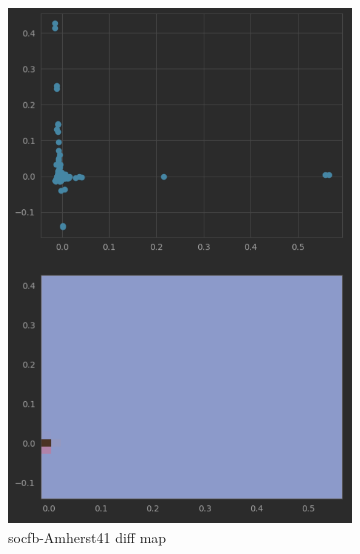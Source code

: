   \begin{figure}
  
    \begin{subfigure}{0.45\textwidth}
      \centering
      \includegraphics[width=\linewidth]{figures/real_diffmap_plot_nonuniformed.png}
      \caption{socfb-Amherst41 diff map}
      \label{fig:sub3}
    \end{subfigure}
    \hfill
    \begin{subfigure}{0.45\textwidth}
      \centering

\end{subfigure}
\end{figure}
